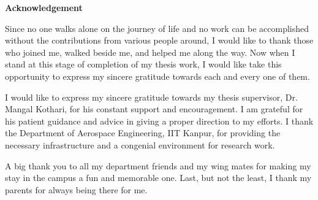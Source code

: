 

\begin{center}
	{\huge{\textbf{Acknowledgement}}}
\end{center}

Since no one walks alone on the journey of life and no work can be accomplished without the contributions from various people around, I would like to thank those who joined me, walked beside me, and helped me along the way. Now when I stand at this stage of completion of my thesis work, I would like take this opportunity to express my sincere gratitude towards each and every one of them.

I would like to express my sincere gratitude towards my thesis supervisor, Dr. Mangal Kothari, for his constant support and encouragement. I am grateful for his patient guidance and advice in giving a proper direction to my efforts. I thank the Department of Aerospace Engineering, IIT Kanpur, for providing the necessary infrastructure and a congenial environment for research work.

A big thank you to all my department friends and my wing mates for making my stay in the campus a fun and memorable one. Last, but not the least, I thank my parents for always being there for me.

